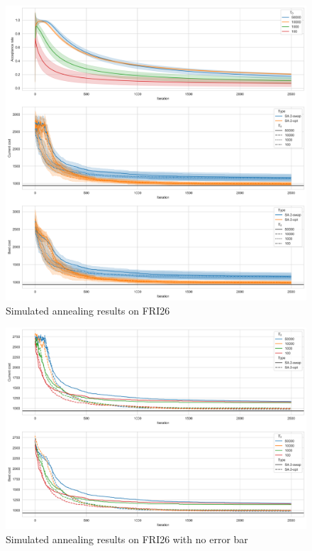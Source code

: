 \begin{figure}
    \centering
    \includegraphics[height=0.5\textheight]{images/fri26_sa.png}
    \caption{Simulated annealing results on FRI26}
    \label{fig:fri26-sa}
\end{figure}

\begin{figure}
    \centering
    \includegraphics[height=0.4\textheight]{images/fri26-no-error.png}
    \caption{Simulated annealing results on FRI26 with no error bar}
    \label{fig:fri26-ne}
\end{figure}

